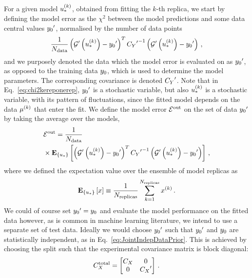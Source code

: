 For a given model $u_*^{(k)}$, obtained from fitting the $k$-th replica, we
start by defining the model error as the $\chi^2$ between the model predictions
and some data central values ${{y_0}^{\prime}}$, normalised by the number
of data points
\begin{equation}
    \label{eq:chi2kereponerep}
    \frac{1}{N_{\rm data}} 
        \left( {{\mathcal{G}}^{\prime}}\left(u_*^{(k)}\right) - {{y_0}^{\prime}} \right)^T
        {{C_{Y}}^{\prime}}^{-1}
        \left( {{\mathcal{G}}^{\prime}}\left(u_*^{(k)}\right) - {{y_0}^{\prime}} \right)\, ,
\end{equation}
and we purposely denoted the data which the model error is evaluated on as
${{y_0}^{\prime}}$, as opposed to the training data $y_0$,
which is used to determine the model parameters. The corresponding covariance is
denoted ${{C_{Y}}^{\prime}}$. Note that in Eq.~\ref{eq:chi2kereponerep},
${{y_0}^{\prime}}$ is a stochastic variable, but also $u_*^{(k)}$ is a
stochastic variable, with its pattern of fluctuations, since the fitted model
depends on the data $\mu^{(k)}$ that enter the fit. We define the
model error $\mathcal{E}^{\rm out}$ on the set of data ${{y_0}^{\prime}}$ by taking the
average over the models,
\begin{align}
    \label{eq:chi2kerep}
    &\mathcal{E}^{\rm out} = \frac{1}{N_{\rm data}}\nonumber \\
    & \times \mathbf{E}_{\{ u_* \}} \left[ 
        \left( {{\mathcal{G}}^{\prime}}\left(u_*^{(k)}\right) - {{y_0}^{\prime}} \right)^T
        {{C_{Y}}^{\prime}}^{-1}
        \left( {{\mathcal{G}}^{\prime}}\left(u_*^{(k)}\right) - {{y_0}^{\prime}} \right)
     \right]\, ,
\end{align}
where we defined the expectation value over the ensemble of model replicas as
\begin{equation}
    \mathbf{E}_{\{ u_* \}} \left[ x \right] \equiv \frac{1}{N_{\rm replicas}} \sum_{k=1}^{N_{\rm replicas}} x^{(k)} \, .
\end{equation}
We could of course set ${{y_0}^{\prime}} = y_0$ and evaluate
the model performance on the fitted data however, as is common in machine
learning literature, we intend to use a separate set of test data. Ideally we
would choose ${{y_0}^{\prime}}$ such that ${{y_0}^{\prime}}$ and
$y_0$ are statistically independent, as in
Eq.~\ref{eq:JointIndepDataPrior}. This is achieved by choosing the split such
that the experimental covariance matrix is block diagonal:
\begin{equation}
    C_X^{\rm total} =
    \begin{bmatrix}
        C_X  & 0  \\ 
        0  & {{C_X}^{\prime}}  \\ 
    \end{bmatrix}\, .
\end{equation}

